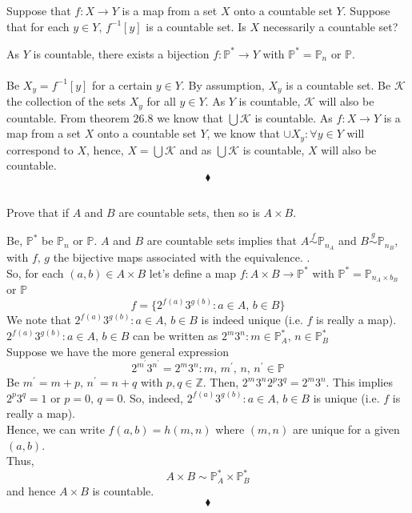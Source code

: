 \subsection{}
\begin{tcolorbox}
Suppose that $f: X\rightarrow Y$ is a map from a set $X$ onto a countable set $Y$. Suppose that for each $y \in  Y,\,  f^{-1}[y]$ is a countable set. Is $X$ necessarily a countable set? 

\end{tcolorbox}
$$ $$
As $Y$ is countable, there exists a bijection $f:\mathbb{P}^* \rightarrow Y $ with $\mathbb{P}^* = \mathbb{P}_n$ or $\mathbb{P}$.\\\\
Be $X_y= f^{-1}[y]$ for a certain $y\in Y$. By assumption, $X_y$ is a countable set. Be $\mathscr{K}$ the collection of the sets $X_y$ for all $y\in Y$. As $Y$ is countable, $\mathscr{K}$ will also be countable. From theorem $\mathbf{26.8}$ we know that $\bigcup\mathscr{K}$ is countable. As $f: X\rightarrow Y$ is a map from a set $X$ onto a countable set $Y$, we know that $\cup X_y:\forall y\in Y$ will correspond to $X$, hence, $X=\bigcup\mathscr{K}$ and as $\bigcup\mathscr{K}$ is countable, $X$ will also be countable.
$$\blacklozenge$$


\subsection{}
\begin{tcolorbox}
Prove that if $A$ and $B$ are countable sets, then so is $A \times B$.  
\end{tcolorbox}
$$ $$
Be, $\mathbb{P}^*$ be $ \mathbb{P}_{n}$ or $\mathbb{P}$.
$A$ and $B$ are countable sets implies that $A\overset{f}{\sim} \mathbb{P}_{n_A}$ and  $B\overset{g}{\sim}\mathbb{P}_{n_B}$, with $f,\, g$ the  bijective maps associated with the equivalence. .\\
So, for each $(a,b)\in  A\times B$ let's define a map $f:A\times B\rightarrow \mathbb{P}^*$ with $\mathbb{P}^*= \mathbb{P}_{n_A\times b_B}$ or $\mathbb{P}$
$$ f=\{2^{f^{}(a)} 3^{g^{}(b)}:a\in A,\, b\in B\}$$
We note that $2^{f^{}(a)} 3^{g^{}(b)}:a\in A,\, b\in B$ is indeed unique (i.e. $f$ is really a map).\\
$2^{f^{}(a)} 3^{g^{}(b)}:a\in A,\, b\in B$ can be written as $2^m 3^n:m\in \mathbb{P}_A^*,\,n\in \mathbb{P}_B^* $\\
Suppose we have the more general expression 
$$2^{m^{'}} 3^{n^{'}}=2^{m} 3^{n}:m, \,m^{'},\, n,\,n^{'}\in \mathbb{P} $$
Be $m^{'}=m+p,\, n^{'}=n+q $ with $ p,q\in \mathbb{Z}$. Then,
$2^{m^{}} 3^{n^{}}2^{p} 3^{q}=2^{m} 3^{n}$. This implies $2^{p} 3^{q}=1$ or $p=0,\, q=0$. So, indeed, $2^{f^{}(a)} 3^{g^{}(b)}:a\in A,\, b\in B$ is unique (i.e. $f$ is really a map).\\
Hence, we can write $f(a,b)= h(m,n)$ where $(m,n)$ are unique for a given $(a,b)$. \\
Thus, $$A\times B \sim \mathbb{P}_A^*\times \mathbb{P}_B^*$$
and hence $A\times B$ is countable.
$$\blacklozenge$$

